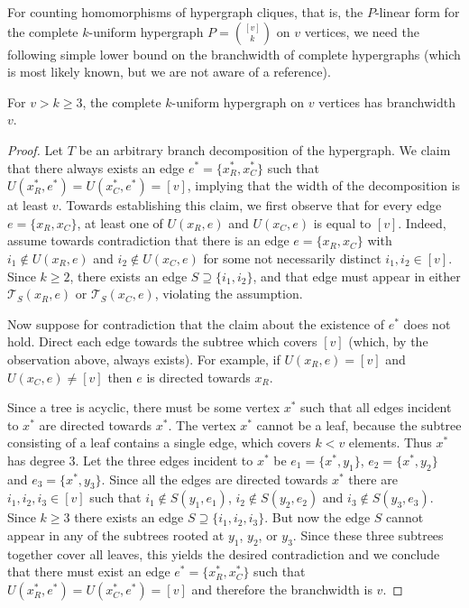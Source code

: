\documentclass{toc}
\newcommand{\ts}{\ensuremath{\mathcal{T}_S}}
\begin{document}
For counting homomorphisms of hypergraph cliques, that is,
the $P$-linear form for the complete $k$-uniform hypergraph
$P=\binom{[v]}{k}$ on $v$ vertices, we need the
following simple lower bound on the branchwidth of complete
hypergraphs (which is most likely known, but we are not aware of a
reference).

\begin{lemma}
  For $v > k \ge 3$, the complete $k$-uniform hypergraph on $v$ vertices has branchwidth $v$.
\end{lemma}

\begin{proof}
  Let $T$ be an arbitrary branch decomposition of the hypergraph.
We claim that there always
exists an edge $e^* = \{x^*_R, x^*_C\}$ such that $U(x^*_R, e^*) = U(x^*_C, e^*) = [v]$, implying that the width of the decomposition is at least $v$.
Towards establishing this claim, we first observe that for every edge $e = \{x_R, x_C\}$,
at least one of
  $U(x_R, e)$ and $U(x_C, e)$ is equal to $[v]$. Indeed, assume towards contradiction
  that there is an edge $e = \{x_R, x_C\}$ with
  $i_1 \not\in U(x_R, e)$ and $i_2 \not\in U(x_C, e)$ for some not
  necessarily distinct $i_1, i_2 \in [v]$.  Since $k \ge 2$, there exists
  an edge $S \supseteq \{i_1, i_2\}$, and that edge must appear in
  either $\ts(x_R, e)$  or $\ts(x_C,  e)$, violating the assumption.

  Now suppose for contradiction that the claim about the existence of $e^*$ does not hold.
  Direct each edge towards the subtree which covers $[v]$ (which, by the observation above, always exists).  For
  example, if $U(x_R, e) = [v]$ and $U(x_C, e) \ne [v]$ then $e$ is
  directed towards $x_R$.

   Since a tree is acyclic, there must be some vertex $x^*$ such that
  all edges incident to $x^*$ are directed towards $x^*$.  The vertex
  $x^*$ cannot be a leaf, because the subtree consisting of a leaf
  contains a single edge, which covers $k < v$ elements.  Thus $x^*$
  has degree $3$.  Let the three edges incident to $x^*$ be $e_1 =
  \{x^*, y_1\}$, $e_2 = \{x^*, y_2\}$ and $e_3 = \{x^*, y_3\}$.  Since
  all the edges are directed towards $x^*$ there are $i_1, i_2, i_3
  \in [v]$ such that $i_1 \not\in S(y_1, e_1)$, $i_2 \not\in S(y_2,
  e_2)$ and $i_3 \not\in S(y_3, e_3)$.  Since $k \ge 3$ there exists an
  edge $S \supseteq \{i_1,i_2,i_3\}$.  But now the edge $S$ cannot appear in any of the subtrees rooted at $y_1$, $y_2$, or $y_3$.
  Since these three subtrees together cover all leaves, this yields
  the desired contradiction and we conclude that there must exist an
  edge $e^* = \{x^*_R, x^*_C\}$ such that $U(x^*_R, e^*) = U(x^*_C, e^*) = [v]$
  and therefore the branchwidth is $v$.
\end{proof}
\end{document}
